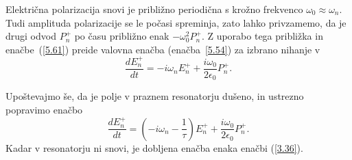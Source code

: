 Električna polarizacija snovi je približno periodična s krožno frekvenco $\omega_0 \approx \omega_n$.
Tudi amplituda polarizacije se le počasi spreminja, zato lahko privzamemo, da je 
drugi odvod $P_n^+$ po času približno enak $-\omega_0^2 P_n^+$. Z uporabo tega
približka in enačbe~(\ref{5.61}) preide valovna enačba (enačba~\ref{5.54}) za izbrano nihanje v 
\begin{equation}  
\label{5.62}
\frac{dE_n^+}{dt}=-i \omega_n E_n^++
\frac{i \omega_0}{2\epsilon_0}P_n^+.
\end{equation}

Upoštevajmo še, da je polje v praznem resonatorju dušeno, in ustrezno popravimo enačbo
\begin{equation}  
\label{5.63}
\frac{dE_n^+}{dt}=\left(-i \omega_n-\frac{1}{\tau}\right) E_n^+ 
+\frac{i \omega_0}{2\epsilon_0}P_n^+.
\end{equation}
Kadar v resonatorju ni snovi, je dobljena enačba enaka enačbi (\ref{3.36}).

